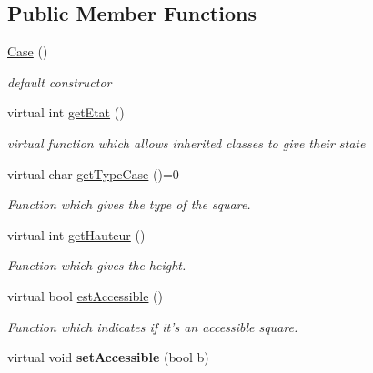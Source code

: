 \subsection*{Public Member Functions}
\begin{DoxyCompactItemize}
\item 
\hypertarget{class_case_a14237e17aab1829965adab76b747db6c}{
\hyperlink{class_case_a14237e17aab1829965adab76b747db6c}{Case} ()}
\label{class_case_a14237e17aab1829965adab76b747db6c}

\begin{DoxyCompactList}\small\item\em default constructor \item\end{DoxyCompactList}\item 
virtual int \hyperlink{class_case_a2a8077c499c658e6306e0b3f4fa9537c}{getEtat} ()
\begin{DoxyCompactList}\small\item\em virtual function which allows inherited classes to give their state \item\end{DoxyCompactList}\item 
virtual char \hyperlink{class_case_a5a7b67b678313b5caab23868219f16b0}{getTypeCase} ()=0
\begin{DoxyCompactList}\small\item\em Function which gives the type of the square. \item\end{DoxyCompactList}\item 
virtual int \hyperlink{class_case_a69f58543e3d54b4b2de28eb63b5f76ce}{getHauteur} ()
\begin{DoxyCompactList}\small\item\em Function which gives the height. \item\end{DoxyCompactList}\item 
virtual bool \hyperlink{class_case_a6198855d58850cf6ed6b04dfc08c7033}{estAccessible} ()
\begin{DoxyCompactList}\small\item\em Function which indicates if it's an accessible square. \item\end{DoxyCompactList}\item 
\hypertarget{class_case_a9dd18212fae5d40f0335416d0d05dc73}{
virtual void {\bfseries setAccessible} (bool b)}
\label{class_case_a9dd18212fae5d40f0335416d0d05dc73}


\end{DoxyCompactItemize}
